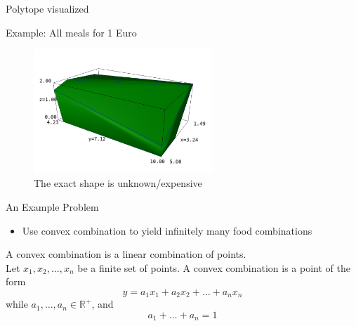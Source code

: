 \documentclass[10pt]{beamer}
\begin{document}
\begin{frame}{Polytope visualized}
	\begin{exampleblock}{Example: All meals for 1 Euro}
		\begin{figure}[ht]
			\includegraphics[width = 0.6\textwidth]{allMeals2.png}
			\caption{The exact shape is unknown/expensive}
		\end{figure}
	\end{exampleblock}
\end{frame}

\begin{frame}{An Example Problem}
	\begin{itemize}
		\item Use convex combination to yield infinitely many food combinations
	\end{itemize}
	\pause 
	\begin{definition}
		A convex combination is a linear combination of points. \\
		
		Let $x_1, x_2, \dots, x_n$ be a finite set of points. A convex combination is a point of the form 
		\begin{equation*}
		y = a_1x_1 + a_2x_2 + \dots + a_nx_n
		\end{equation*}
		while $a_1, \dots, a_n\in\mathbb{R^+}$, and
		\begin{equation*}
		a_1 + \dots + a_n = 1
		\end{equation*}
	\end{definition}
\end{frame}
\end{document}
